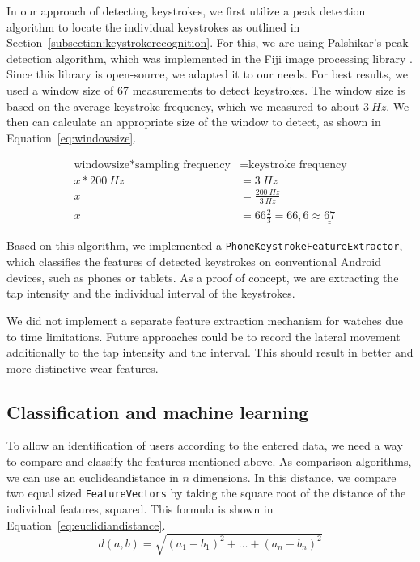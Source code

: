 In our approach of detecting keystrokes, we first utilize a peak detection algorithm to locate the individual keystrokes as outlined in Section~\ref{subsection:keystrokerecognition}. For this, we are using Palshikar's peak detection algorithm, which was implemented in the Fiji image processing library \cite{palshikar2009simple, tinevez2011peak}. Since this library is open-source, we adapted it to our needs. For best results, we used a window size of 67 measurements to detect keystrokes. The window size is based on the average keystroke frequency, which we measured to about $\SI{3}{Hz}$. We then can calculate an appropriate size of the window to detect, as shown in Equation~\ref{eq:windowsize}.

\begin{equation}\label{eq:windowsize}\begin{split}
\textrm{windowsize} * \textrm{sampling frequency} & = \textrm{keystroke frequency}\\
x * \SI{200}{Hz} & = \SI{3}{Hz}\\
x & = \frac{\SI{200}{Hz}}{\SI{3}{Hz}}\\
x & = 66 \frac{2}{3} = 66,\overline{6} \approx \underline{\underline{67}}
\end{split}\end{equation}

Based on this algorithm, we implemented a \lstinline$PhoneKeystrokeFeatureExtractor$,
which classifies the features of detected keystrokes on conventional Android devices, such as phones or tablets. As a proof of concept, we are extracting the tap intensity and the individual interval of the keystrokes.
    
We did not implement a separate feature extraction mechanism for watches due to time limitations. Future approaches could be to record the lateral movement additionally to the tap intensity and the interval. This should result in better and more distinctive wear features.

\subsection{Classification and machine learning}
To allow an identification of users according to the entered data, we need a way to compare and classify the features mentioned above. 
As comparison algorithms, we can use an \gls{euclideandistance} in $n$ dimensions. In this distance, we compare two equal sized \lstinline$FeatureVectors$ by taking the square root of the distance of the individual features, squared. This formula is shown in Equation~\ref{eq:euclidiandistance}.
\begin{equation}\label{eq:euclidiandistance}
d(a, b) = \sqrt{(a_1 - b_1)^2 + \ldots + (a_n - b_n)^2}
\end{equation}


